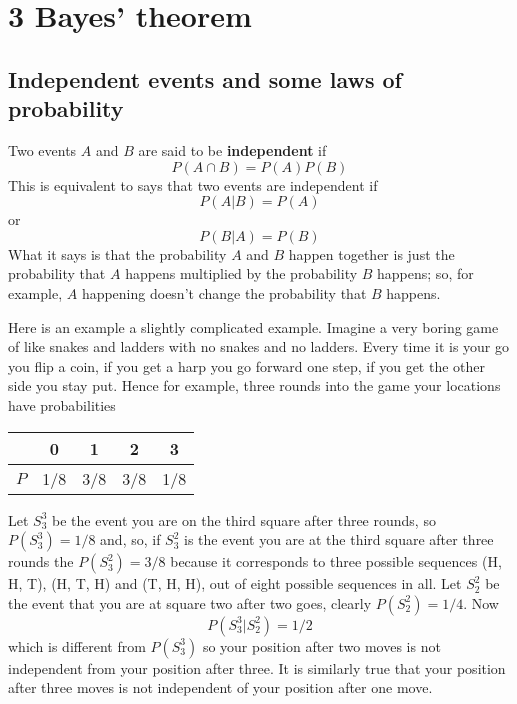 \documentclass[11pt,a4paper]{scrartcl}
\begin{document}
\section*{3 Bayes' theorem}

\subsection*{Independent events and some laws of probability}

Two events $A$ and $B$ are said to be \textbf{independent} if 
\begin{equation}
P(A\cap B)=P(A)P(B)
\end{equation}
This is equivalent to says that two events are independent if
\begin{equation}
P(A|B)=P(A)
\end{equation}
or 
\begin{equation}
P(B|A)=P(B)
\end{equation}
What it says is that the probability $A$ and $B$ happen together is
just the probability that $A$ happens multiplied by the probability
$B$ happens; so, for example, $A$ happening doesn't change the
probability that $B$ happens.


Here is an example a slightly complicated example. Imagine a very
boring game of like snakes and ladders with no snakes and no
ladders. Every time it is your go you flip a coin, if you get a harp
you go forward one step, if you get the other side you stay put. Hence for example, three
rounds into the game your locations have probabilities
\begin{center}
\begin{tabular}{c|cccc}
&0&1&2&3\\
\hline
$P$&1/8&3/8&3/8&1/8
\end{tabular}
\end{center}
Let $S_3^3$ be the event you are on the third square after three
rounds, so $P(S_3^3)=1/8$ and, so, if $S_3^2$ is the event you are at
the third square after three rounds the $P(S_3^2)=3/8$ because it
corresponds to three possible sequences (H, H, T), (H, T, H) and (T,
H, H), out of eight possible sequences in all. Let $S_2^2$ be the
event that you are at square two after two goes, clearly
$P(S_2^2)=1/4$. Now
\begin{equation}
P(S_3^3|S_2^2)=1/2
\end{equation}
which is different from $P(S_3^3)$ so your position after two moves is
not independent from your position after three. It is similarly true
that your position after three moves is not independent of your
position after one move. 
\end{document}
